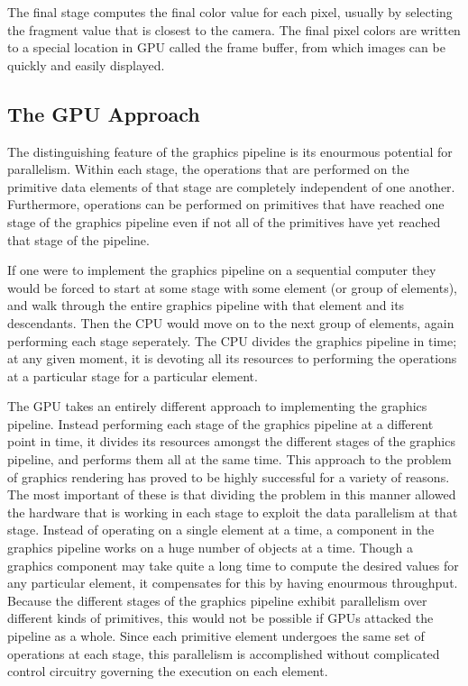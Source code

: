\documentclass[12pt,twoside]{reedthesis}
\begin{document}
The final stage computes the final color value for each pixel, usually by selecting the fragment value that is closest to the camera. The final pixel colors are written to a special location in GPU called the frame buffer, from which images can be quickly and easily displayed.

\subsection{The GPU Approach}

The distinguishing feature of the graphics pipeline is its enourmous potential for parallelism. Within each stage, the operations that are performed on the primitive data elements of that stage are completely independent of one another. Furthermore, operations can be performed on primitives that have reached one stage of the graphics pipeline even if not all of the primitives have yet reached that stage of the pipeline.

If one were to implement the graphics pipeline on a sequential computer they would be forced to start at some stage with some element (or group of elements), and walk through the entire graphics pipeline with that element and its descendants. Then the CPU would move on to the next group of elements, again performing each stage seperately. The CPU divides the graphics pipeline in time; at any given moment, it is devoting all its resources to performing the operations at a particular stage for a particular element.

The GPU takes an entirely different approach to implementing the graphics pipeline. Instead performing each stage of the graphics pipeline at a different point in time, it divides its resources amongst the different stages of the graphics pipeline, and performs them all at the same time. This approach to the problem of graphics rendering has proved to be highly successful for a variety of reasons. The most important of these is that dividing the problem in this manner allowed the hardware that is working in each stage to exploit the data parallelism at that stage. Instead of operating on a single element at a time, a component in the graphics pipeline works on a huge number of objects at a time. Though a graphics component may take quite a long time to compute the desired values for any particular element, it compensates for this by having enourmous throughput. Because the different stages of the graphics pipeline exhibit parallelism over different kinds of primitives, this would not be possible if GPUs attacked the pipeline as a whole. Since each primitive element undergoes the same set of operations at each stage, this parallelism is accomplished without complicated control circuitry governing the execution on each element.
\end{document}
